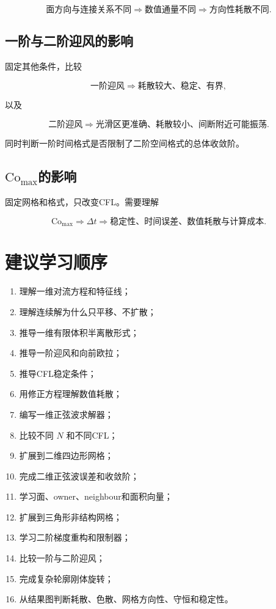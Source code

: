 \documentclass[UTF8,12pt,a4paper,fontset=fandol]{ctexart}
\newcommand{\Cmax}{\mathrm{Co}_{\max}}
\begin{document}
\begin{equation}
\text{面方向与连接关系不同}
\Longrightarrow
\text{数值通量不同}
\Longrightarrow
\text{方向性耗散不同}.
\end{equation}

\subsection{一阶与二阶迎风的影响}

固定其他条件，比较

\begin{equation}
\text{一阶迎风}
\Longrightarrow
\text{耗散较大、稳定、有界},
\end{equation}

以及

\begin{equation}
\text{二阶迎风}
\Longrightarrow
\text{光滑区更准确、耗散较小、间断附近可能振荡}.
\end{equation}

同时判断一阶时间格式是否限制了二阶空间格式的总体收敛阶。

\subsection{\texorpdfstring{$\Cmax$}{Co\_max}的影响}

固定网格和格式，只改变CFL。需要理解

\begin{equation}
\Cmax
\Longrightarrow
\Delta t
\Longrightarrow
\text{稳定性、时间误差、数值耗散与计算成本}.
\end{equation}

\section{建议学习顺序}

\begin{enumerate}
  \item 理解一维对流方程和特征线；
  \item 理解连续解为什么只平移、不扩散；
  \item 推导一维有限体积半离散形式；
  \item 推导一阶迎风和向前欧拉；
  \item 推导CFL稳定条件；
  \item 用修正方程理解数值耗散；
  \item 编写一维正弦波求解器；
  \item 比较不同 $N$ 和不同CFL；
  \item 扩展到二维四边形网格；
  \item 完成二维正弦波误差和收敛阶；
  \item 学习面、owner、neighbour和面积向量；
  \item 扩展到三角形非结构网格；
  \item 学习二阶梯度重构和限制器；
  \item 比较一阶与二阶迎风；
  \item 完成复杂轮廓刚体旋转；
  \item 从结果图判断耗散、色散、网格方向性、守恒和稳定性。
\end{enumerate}
\end{document}
